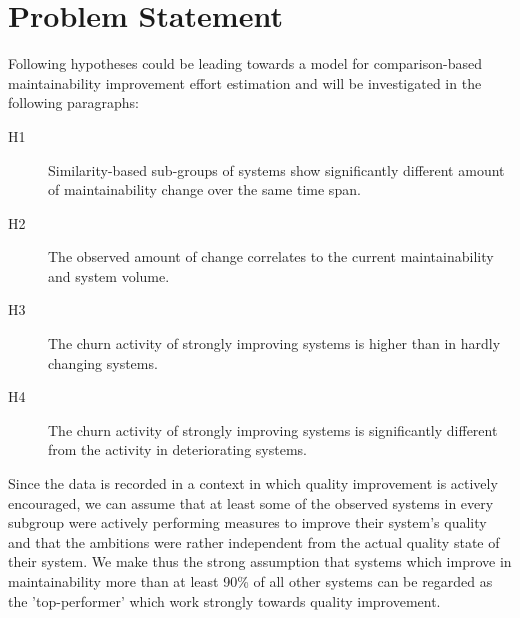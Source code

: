 \section{Problem Statement} 
\label{sec:ProblemStatement}
Following hypotheses could be leading towards a model for comparison-based maintainability improvement effort estimation and will be investigated in the following paragraphs:

\begin{description}
  \item[H1] Similarity-based sub-groups of systems show significantly different amount of maintainability change over the same time span.
  \item[H2] The observed amount of change correlates to the
current maintainability and system volume.
 \item[H3] The churn activity of strongly improving systems is higher than in hardly changing systems.
 \item[H4] The churn activity of strongly improving systems is significantly different from the activity in deteriorating systems.
\end{description}

Since the data is recorded in a context in which quality improvement is actively encouraged, we can assume that at least some of the observed systems in every subgroup were actively performing measures to improve their system's quality and that the ambitions were rather independent from the actual quality state of their system. We make thus the strong assumption that systems which improve in maintainability more than at least 90\% of all other systems can be regarded as the 'top-performer' which work strongly towards quality improvement. 

